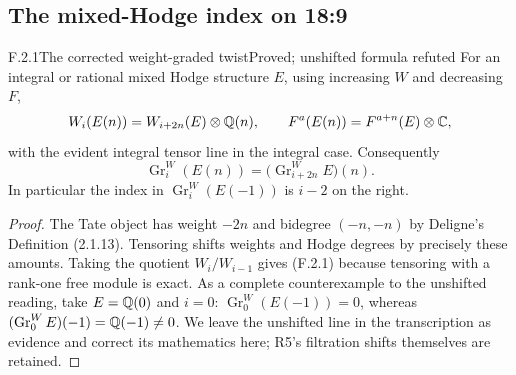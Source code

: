 \subsection{The mixed-Hodge index on 18:9}

\begin{result}{F.2.1}{The corrected weight-graded twist}{Proved; unshifted formula refuted}
For an integral or rational mixed Hodge structure $E$, using increasing $W$ and decreasing $F$,
\[
 W_i(E(n))=W_{i+2n}(E)\otimes\mathbb Q(n),\qquad
 F^a(E(n))=F^{a+n}(E)\otimes\mathbb C,
\]
with the evident integral tensor line in the integral case. Consequently
\[
 \operatorname{Gr}_i^W(E(n))=
 \bigl(\operatorname{Gr}_{i+2n}^W E\bigr)(n).
 \tag{F.2.1}
\]
In particular the index in $\operatorname{Gr}_i^W(E(-1))$ is $i-2$ on the right.
\end{result}
\begin{proof}
The Tate object has weight $-2n$ and bidegree $(-n,-n)$ by Deligne's Definition (2.1.13). Tensoring shifts weights and Hodge degrees by precisely these amounts. Taking the quotient $W_i/W_{i-1}$ gives (F.2.1) because tensoring with a rank-one free module is exact. As a complete counterexample to the unshifted reading, take $E=\mathbb Q(0)$ and $i=0$: $\operatorname{Gr}_0^W(E(-1))=0$, whereas $(\operatorname{Gr}_0^W E)(-1)=\mathbb Q(-1)\ne0$. We leave the unshifted line in the transcription as evidence and correct its mathematics here; R5's filtration shifts themselves are retained.
\end{proof}


